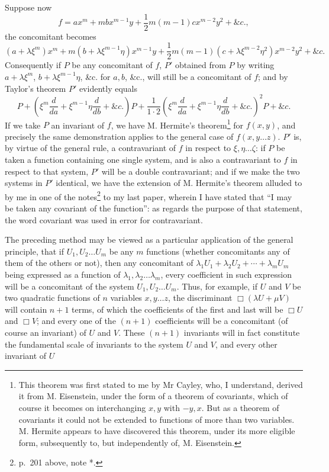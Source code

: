 \documentclass[11pt]{article}
\begin{document}
{{Suppose now
\[
f=ax^m+mbx^{m-1}y+\frac12m(m-1)cx^{m-2}y^2+\&c.,
\]
the concomitant becomes
\[
(a+\lambda\xi^m)x^m+m(b+\lambda\xi^{m-1}\eta)x^{m-1}y+\frac12m(m-1)(c+\lambda\xi^{m-2}\eta^2)x^{m-2}y^2+\&c.
\]
Consequently if $P$ be any concomitant of $f$, $P'$ obtained from $P$ by writing $a+\lambda\xi^m$, $b+\lambda\xi^{m-1}\eta$, \&c. for $a,b$, \&c., will still be a concomitant of $f$; and by Taylor's theorem $P'$ evidently equals
\[
P+\left(\xi^m\frac{d}{da}+\xi^{m-1}\eta\frac{d}{db}+\&c.\right)P
+\frac1{1\cdot2}\left(\xi^m\frac{d}{da}+\xi^{m-1}\eta\frac{d}{db}+\&c.\right)^2P+\&c.
\]
If we take $P$ an invariant of $f$, we have M. Hermite's theorem\footnote{This theorem was first stated to me by Mr Cayley, who, I understand, derived it from M. Eisenstein, under the form of a theorem of covariants, which of course it becomes on interchanging $x,y$ with $-y,x$. But as a theorem of covariants it could not be extended to functions of more than two variables. M. Hermite appears to have discovered this theorem, under its more eligible form, subsequently to, but independently of, M. Eisenstein.} for $f(x,y)$, and precisely the same demonstration applies to the general case of $f(x,y\ldots z)$. $P'$ is, by virtue of the general rule, a contravariant of $f$ in respect to $\xi,\eta\ldots\zeta$: if $P$ be taken a function containing one single system, and is also a contravariant to $f$ in respect to that system, $P'$ will be a double contravariant; and if we make the two systems in $P'$ identical, we have the extension of M. Hermite's theorem alluded to by me in one of the notes\footnote{p.~201 above, note *.} to my last paper, wherein I have stated that ``I may be taken any covariant of the function'': as regards the purpose of that statement, the word covariant was used in error for contravariant.

The preceding method may be viewed as a particular application of the general principle, that if $U_1,U_2\ldots U_m$ be any $m$ functions (whether concomitants any of them of the others or not), then any concomitant of $\lambda_1U_1+\lambda_2U_2+\cdots+\lambda_mU_m$ being expressed as a function of $\lambda_1,\lambda_2\ldots\lambda_m$, every coefficient in such expression will be a concomitant of the system $U_1,U_2\ldots U_m$. Thus, for example, if $U$ and $V$ be two quadratic functions of $n$ variables $x,y\ldots z$, the discriminant $\Box(\lambda U+\mu V)$ will contain $n+1$ terms, of which the coefficients of the first and last will be $\Box U$ and $\Box V$; and every one of the $(n+1)$ coefficients will be a concomitant (of course an invariant) of $U$ and $V$. These $(n+1)$ invariants will in fact constitute the fundamental scale of invariants to the system $U$ and $V$, and every other invariant of $U$

}}
\end{document}
